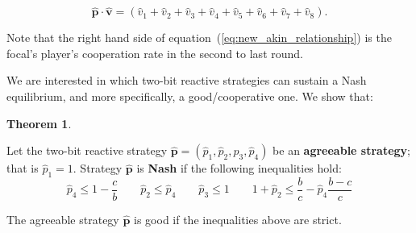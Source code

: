 \documentclass{article}
\theoremstyle{definition}
\newtheorem{theorem}{Theorem}[section]
\begin{document}
\begin{equation}\label{eq:new_akin_relationship}
  \mathbf{\hat{p}} \cdot \mathbf{\hat{v}} = (\hat{v}_1 + \hat{v}_2 + \hat{v}_3 + \hat{v}_4 + \hat{v}_5 + \hat{v}_6 + \hat{v}_7 + \hat{v}_8).
\end{equation}

Note that the right hand side of equation~(\ref{eq:new_akin_relationship}) is
the focal's player's cooperation rate in the second to last round.

We are interested in which two-bit reactive strategies can sustain a Nash
equilibrium, and more specifically, a good/cooperative one. We show that:

\begin{theorem}\label{theorem:two_bit_nash_and_good}

  Let the two-bit reactive strategy \(\mathbf{\hat{p}} = (\hat{p}_{1}, \hat{p}_{2}, \hat{p}_{3}, \hat{p}_{4})\) be an \textbf{agreeable
  strategy}; that is \(\hat{p}_1 = 1\). Strategy \(\mathbf{\hat{p}}\) is \textbf{Nash} if the
  following inequalities hold:
  \begin{equation*}
      \hat{p}_4 \leq 1 - \frac{c}{b} \qquad  \hat{p}_2  \leq \hat{p}_4 \qquad \hat{p}_3 \leq 1 \qquad 1 + \hat{p}_2 \leq \frac{b}{c} - \hat{p}_4 \frac{b\!-\!c}{c}
  \end{equation*}
  
  The agreeable strategy \(\mathbf{\hat{p}}\) is good if the inequalities above are strict.
  \end{theorem}
  
\end{document}
